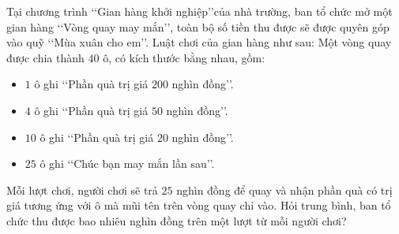 \begin{ex}%
	Tại chương trình \lq\lq Gian hàng khởi nghiệp\rq\rq của nhà trường, ban tổ chức mở một gian hàng \lq\lq Vòng quay may mắn\rq\rq, toàn bộ số tiền thu được sẽ được quyên góp vào quỹ \lq\lq Mùa xuân cho em\rq\rq. Luật chơi của gian hàng như sau: Một vòng quay được chia thành $40$ ô, có kích thước bằng nhau, gồm:
\begin{itemize}
\item[-] $1$ ô ghi \lq\lq Phần quà trị giá $200$ nghìn đồng\rq\rq.
\item[-] $4$ ô ghi \lq\lq Phần quà trị giá $50$ nghìn đồng\rq\rq.
\item[-] $10$ ô ghi \lq\lq Phần quà trị giá $20$ nghìn đồng\rq\rq.
\item[-] $25$ ô ghi \lq\lq Chúc bạn may mắn lần sau\rq\rq.
\end{itemize}
Mỗi lượt chơi, người chơi sẽ trả $25$ nghìn đồng để quay và nhận phần quà có trị giá tương ứng với ô mà mũi tên trên vòng quay chỉ vào. Hỏi trung bình, ban tổ chức thu được bao nhiêu nghìn đồng trên một lượt từ mỗi người chơi?
\end{ex}
